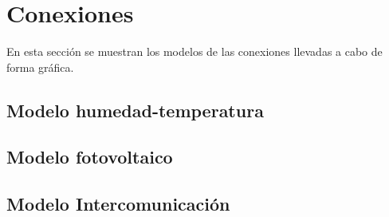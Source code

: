 \section{Conexiones}\label{sec:conexiones}

En esta secci\'on se muestran los modelos de las conexiones llevadas a
cabo de forma gr\'afica.

\subsection{Modelo humedad-temperatura}

\subsection{Modelo fotovoltaico}

\subsection{Modelo Intercomunicaci\'on}

